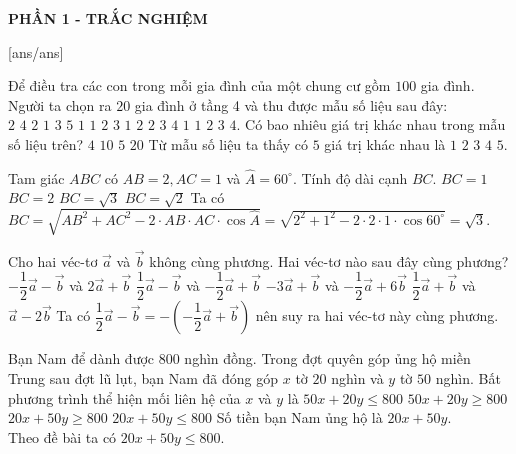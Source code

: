 
\begin{center}
	\textbf{PHẦN 1 - TRẮC NGHIỆM}
\end{center}
[ans/ans]
\begin{ex}%
    Để điều tra các con trong mỗi gia đình của một chung cư gồm $ 100 $ gia đình. Người ta chọn ra $ 20 $ gia đình ở tầng 4 và thu được mẫu số liệu sau đây: $ 2\,\, 4\,\, 2 \,\,1 \,\,3\,\, 5 \,\,1 \,\,1 \,\,2 \,\,3 \,\,1\,\, 2\,\, 2 \,\,3 \,\,4 \,\,1\,\, 1 \,\,2 \,\,3\,\, 4 $. Có bao nhiêu giá trị khác nhau trong mẫu số liệu trên?
    \choice
    {$ 4 $}
    {$ 10 $}
    {\True $ 5 $}
    {$ 20 $}  
    \loigiai
    {
        Từ mẫu số liệu ta thấy có $ 5 $ giá trị khác nhau là $ 1\,\,2\,\,3\,\,4\,\,5 $.
    }
\end{ex}
\begin{ex}%
    Tam giác $ ABC $ có $ AB=2, AC=1 $ và $ \widehat{A}=60^\circ $. Tính độ dài cạnh $ BC $.
    \choice
    {$ BC=1 $}
    {$ BC=2 $}
    {\True $ BC=\sqrt{3} $}
    {$ BC=\sqrt{2} $}  
    \loigiai
    {
        Ta có $ BC=\sqrt{AB^2+AC^2-2\cdot AB\cdot AC\cdot \cos \widehat{A} }=\sqrt{2^2+1^2-2\cdot 2\cdot 1\cdot \cos 60^\circ } =\sqrt{3}$.
    }
\end{ex}
\begin{ex}%
Cho hai  véc-tơ $ \vec{a} $ và $ \vec{b} $ không cùng phương. Hai véc-tơ nào sau đây cùng phương?
\choice
{$ -\dfrac{1}{2}\vec{a}-\vec{b} $ và $ 2\vec{a}+\vec{b} $}
{\True $ \dfrac{1}{2}\vec{a}-\vec{b} $ và $ -\dfrac{1}{2}\vec{a}+\vec{b} $}
{$-3\vec{a}+\vec{b} $ và $ -\dfrac{1}{2}\vec{a}+6\vec{b} $}
{$ \dfrac{1}{2}\vec{a}+\vec{b} $ và $ \vec{a}-2\vec{b} $}  
\loigiai
{
    Ta có $ \dfrac{1}{2}\vec{a}-\vec{b}=-\left(-\dfrac{1}{2}\vec{a}+\vec{b}\right) $ nên suy ra hai véc-tơ này cùng phương.
}
\end{ex}
\begin{ex}%
    Bạn Nam để dành được $ 800 $ nghìn đồng. Trong đợt quyên góp ủng hộ miền Trung sau đợt lũ lụt, bạn Nam đã đóng góp $ x $ tờ $ 20 $ nghìn và $ y $ tờ $ 50 $ nghìn. Bất phương trình thể hiện mối liên hệ của $ x $ và $ y $ là
    \choice
    {$ 50x+20y\le 800 $}
    {$ 50x+20y\ge 800 $}
    {$ 20x+50y\ge 800 $}
    {\True $ 20x+50y\le 800 $}  
    \loigiai
    {
        Số tiền bạn Nam ủng hộ là $ 20x+50y $.\\
        Theo đề bài ta có $ 20x+50y \le 800 $.
    }
\end{ex}

